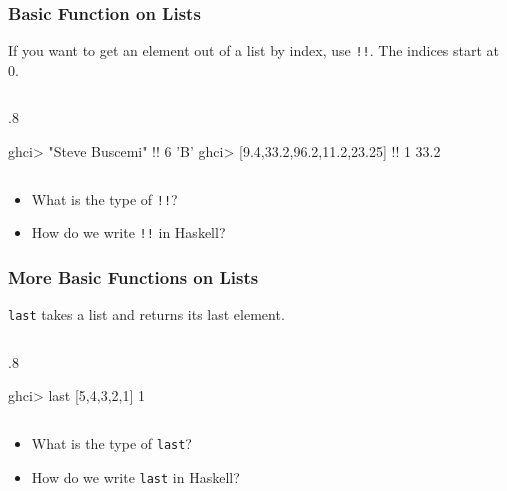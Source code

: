 \documentclass{beamer}
\newenvironment{codeblock}[1][.8]{%
\begin{columns}
\begin{column}{#1\linewidth}
\begin{exampleblock}{}}{%
\end{exampleblock}
\end{column}
\end{columns}}
\begin{document}
\begin{frame}[fragile]
\frametitle{Basic Function on Lists}

If you want to get an element out of a list by index, use \verb+!!+. The indices start at 0.

\begin{codeblock}
\begin{hcode}
ghci> "Steve Buscemi" !! 6  
'B'  
ghci> [9.4,33.2,96.2,11.2,23.25] !! 1  
33.2  
\end{hcode}
\end{codeblock}

\begin{itemize}

\item What is the type of \verb+!!+?

\item How do we write \verb+!!+ in Haskell?

\end{itemize}

\end{frame}


\begin{frame}[fragile]
\frametitle{More Basic Functions on Lists}

\verb+last+ takes a list and returns its last element.

\begin{codeblock}
\begin{hcode}
ghci> last [5,4,3,2,1]  
1   
\end{hcode}
\end{codeblock}

\begin{itemize}

\item What is the type of \verb+last+?

\item How do we write \verb+last+ in Haskell?

\end{itemize}

\end{frame}

\end{document}
